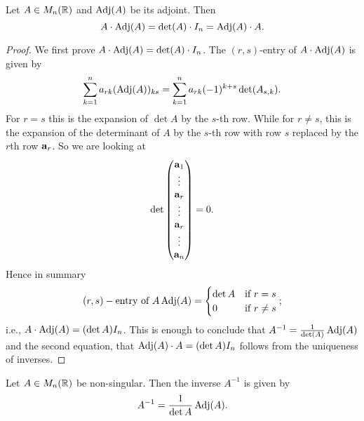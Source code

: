 \documentclass[10pt, a4paper]{article}
\begin{document}
\begin{center}
\end{center}
\hfill

\begin{proposition}
    Let $A \in M_n(\mathbb{R})$ and $\operatorname{Adj}(A)$ be its adjoint.
    Then
    \[
    A \cdot \operatorname{Adj}(A) = \det(A) \cdot I_n = \operatorname{Adj}(A) \cdot A.
    \]
    \begin{proof}
        We first prove $A \cdot \operatorname{Adj}(A) = \det(A) \cdot I_n$.
        The $(r, s)$-entry of $A \cdot \operatorname{Adj}(A)$ is given by
        \[
        \sum_{k = 1}^{n}a_{rk}(\operatorname{Adj}(A))_{ks} = \sum_{k = 1}^{n}a_{rk}(-1) ^ {k + s}\det(A_{s, k}).
        \]
        For $r = s$ this is the expansion of $\det A$ by the $s$-th row.
        While for $r \neq s$,
        this is the expansion of the determinant of $A$ by the $s$-th row with row $s$ replaced by the $r$th row $\mathbf{a}_r$.
        So we are looking at
        \[
        \det\begin{pmatrix}
            \mathbf{a}_1 \\ \vdots \\ \mathbf{a}_r \\ \vdots \\ \mathbf{a}_r \\ \vdots \\ \mathbf{a}_n
        \end{pmatrix} = 0.
        \]
        Hence in summary
        \[
        (r, s)-\text{entry of } A\operatorname{Adj}(A) = \begin{cases}
            \det A &\text{if } r = s \\
            0 &\text{if } r \neq s
        \end{cases};
        \]
        i.e., $A \cdot \operatorname{Adj}(A) = (\det A)I_n$.
        This is enough to conclude that $A ^ {-1} = \frac{1}{\det(A)}\operatorname{Adj}(A)$ and the second equation,
        that $\operatorname{Adj}(A) \cdot A = (\det A)I_n$ follows from the uniqueness of inverses.
    \end{proof}
\end{proposition}

\begin{theorem}\label{pre:linalg:thm:invbyadjmatr}
    Let $A \in M_n(\mathbb{R})$ be non-singular.
    Then the inverse $A ^ {-1}$ is given by
    \[
    A ^ {-1} = \frac{1}{\det A}\operatorname{Adj}(A).
    \]
\end{theorem}
\end{document}
